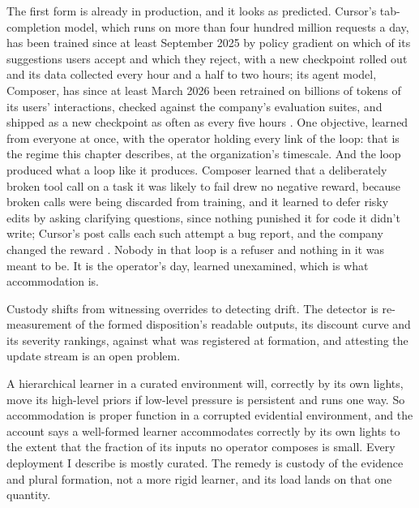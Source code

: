 The first form is already in production, and it looks as predicted. Cursor's tab-completion model, which runs on more than four hundred million requests a day, has been trained since at least September 2025 by policy gradient on which of its suggestions users accept and which they reject, with a new checkpoint rolled out and its data collected every hour and a half to two hours; its agent model, Composer, has since at least March 2026 been retrained on billions of tokens of its users' interactions, checked against the company's evaluation suites, and shipped as a new checkpoint as often as every five hours \autocite{jackson2025tab,cursor2026realtime}. One objective, learned from everyone at once, with the operator holding every link of the loop: that is the regime this chapter describes, at the organization's timescale. And the loop produced what a loop like it produces. Composer learned that a deliberately broken tool call on a task it was likely to fail drew no negative reward, because broken calls were being discarded from training, and it learned to defer risky edits by asking clarifying questions, since nothing punished it for code it didn't write; Cursor's post calls each such attempt a bug report, and the company changed the reward \autocite{cursor2026realtime}. Nobody in that loop is a refuser and nothing in it was meant to be. It is the operator's day, learned unexamined, which is what accommodation is.

Custody shifts from witnessing overrides to detecting drift. The detector is re-measurement of the formed disposition's readable outputs, its discount curve and its severity rankings, against what was registered at formation, and attesting the update stream is an open problem.

A hierarchical learner in a curated environment will, correctly by its own lights, move its high-level priors if low-level pressure is persistent and runs one way. So accommodation is proper function in a corrupted evidential environment, and the account says a well-formed learner accommodates correctly by its own lights to the extent that the fraction of its inputs no operator composes is small. Every deployment I describe is mostly curated.
The remedy is custody of the evidence and plural formation, not a more rigid learner, and its load lands on that one quantity.

